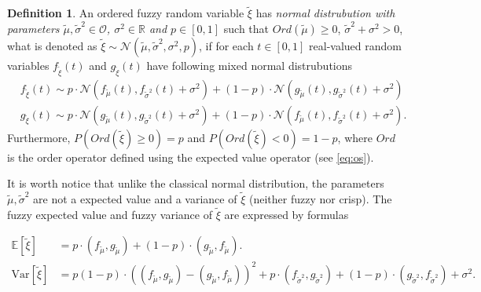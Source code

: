 \documentclass[review]{elsarticle}
\theoremstyle{definition}
\newtheorem{definition}{Definition}
\theoremstyle{theorem}
\begin{document}
\begin{definition}
An ordered fuzzy random variable $\tilde{\xi}$ has {\it normal distrubution with parameters $\tilde{\mu}, \tilde{\sigma}^2\in\mathcal{O}$, $\sigma^2\in\mathbb{R}$ and $p\in [0,1]$} such that $Ord(\tilde{\mu})\geq 0$, $\tilde{\sigma}^2+\sigma^2>0$, what is denoted as $\tilde{\xi}\sim \mathcal{N}(\tilde{\mu},\tilde{\sigma}^2,\sigma^2,p)$, if for each  $t\in[0,1]$ real-valued random variables $f_{\tilde{\xi}}(t)$ and $g_{\tilde{\xi}}(t)$ have following mixed normal distrubutions
\begin{align}
&f_{\tilde{\xi}}(t)\sim p\cdot \mathcal{N}\left(f_{\tilde{\mu}}(t),f_{\tilde{\sigma}^2}(t)+\sigma^2\right)+(1-p)\cdot \mathcal{N}\left(g_{\tilde{\mu}}(t),g_{\tilde{\sigma}^2}(t)+\sigma^2\right)\nonumber\\
&g_{\tilde{\xi}}(t)\sim p\cdot \mathcal{N}\left(g_{\tilde{\mu}}(t),g_{\tilde{\sigma}^2}(t)+\sigma^2\right)+(1-p)\cdot \mathcal{N}\left(f_{\tilde{\mu}}(t),f_{\tilde{\sigma}^2}(t)+\sigma^2\right).\nonumber
\end{align}
Furthermore, $ P(Ord(\tilde{\xi}) \geq 0) = p $ and $ P(Ord(\tilde{\xi}) <0) = 1-p $, where $ Ord $ is the order operator defined using the expected value operator (see \eqref{eq:os}).
\end{definition} 

It is worth notice that unlike the classical normal distribution, the parameters $ \tilde{\mu}, \tilde{\sigma}^2 $ are not a  expected value and a variance of $ \tilde{\xi} $ (neither fuzzy nor crisp). The fuzzy expected value and fuzzy variance of $ \tilde{\xi} $ are expressed by formulas

\begin{align}
\label{eq:30}
\mathbb{E}[\tilde{\xi}]&=p\cdot(f_{\tilde{\mu}},g_{\tilde{\mu}})+(1-p)\cdot(g_{\tilde{\mu}},f_{\tilde{\mu}}).\\
\label{eq:31}
\mathrm{Var}[\tilde{\xi}]&=p(1-p)\cdot\left((f_{\tilde{\mu}},g_{\tilde{\mu}})-(g_{\tilde{\mu}},f_{\tilde{\mu}})\right)^2+p\cdot(f_{\tilde{\sigma}^2},g_{\tilde{\sigma}^2})+(1-p)\cdot (g_{\tilde{\sigma}^2},f_{\tilde{\sigma}^2})+\sigma^2.
\end{align}
\end{document}
